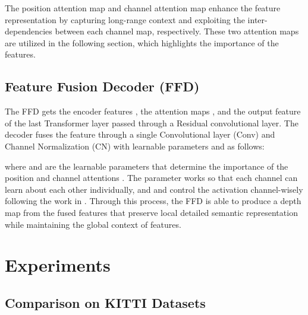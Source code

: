 \documentclass[letterpaper]{article} \usepackage{aaai23}  \usepackage{times}  \usepackage{helvet}  \usepackage{courier}  \usepackage[hyphens]{url}  \usepackage{graphicx} \urlstyle{rm} \def\UrlFont{\rm}  \usepackage{natbib}  \usepackage{caption} \frenchspacing  \setlength{\pdfpagewidth}{8.5in} \setlength{\pdfpageheight}{11in} \usepackage{algorithm}
\begin{document}
The position attention map  and channel attention map  enhance the feature representation by capturing long-range context and exploiting the inter-dependencies between each channel map, respectively. 
These two attention maps are utilized in the following section, which highlights the importance of the features.

\subsection{Feature Fusion Decoder (FFD)}
\label{sec:FFD}
The FFD gets the encoder features , the attention maps , and the output feature  of the last Transformer layer passed through a Residual convolutional layer. 
The decoder fuses the feature  through a single Convolutional layer (Conv) and Channel Normalization (CN) with learnable parameters  and  as follows:

where  and  are the learnable parameters that determine the importance of the position and channel attentions \cite{zhang2019self}.
The parameter  works so that each channel can learn about each other individually, and  and  control the activation channel-wisely following the work in \cite{yang2020gated}. 
Through this process, the FFD is able to produce a depth map from the fused features that preserve local detailed semantic representation while maintaining the global context of features.

\section{Experiments}

\subsection{Comparison on KITTI Datasets}
\label{sec_KITTI}
\end{document}
